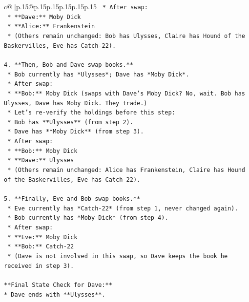 \documentclass{article}
\begin{document}
{\begin{supertabular}{c@{$\;$}|p{.15\linewidth}@{}p{.15\linewidth}p{.15\linewidth}p{.15\linewidth}p{.15\linewidth}p{.15\linewidth}}
{{{\texttt{    *   After swap:} \\
\texttt{        *   **Dave:** Moby Dick} \\
\texttt{        *   **Alice:** Frankenstein} \\
\texttt{    *   (Others remain unchanged: Bob has Ulysses, Claire has Hound of the Baskervilles, Eve has Catch{-}22).} \\
\\ 
\texttt{4.  **Then, Bob and Dave swap books.**} \\
\texttt{    *   Bob currently has *Ulysses*; Dave has *Moby Dick*.} \\
\texttt{    *   After swap:} \\
\texttt{        *   **Bob:** Moby Dick (swaps with Dave's Moby Dick? No, wait. Bob has Ulysses, Dave has Moby Dick. They trade.)} \\
\texttt{        *   Let's re{-}verify the holdings before this step:} \\
\texttt{            *   Bob has **Ulysses** (from step 2).} \\
\texttt{            *   Dave has **Moby Dick** (from step 3).} \\
\texttt{    *   After swap:} \\
\texttt{        *   **Bob:** Moby Dick} \\
\texttt{        *   **Dave:** Ulysses} \\
\texttt{    *   (Others remain unchanged: Alice has Frankenstein, Claire has Hound of the Baskervilles, Eve has Catch{-}22).} \\
\\ 
\texttt{5.  **Finally, Eve and Bob swap books.**} \\
\texttt{    *   Eve currently has *Catch{-}22* (from step 1, never changed again).} \\
\texttt{    *   Bob currently has *Moby Dick* (from step 4).} \\
\texttt{    *   After swap:} \\
\texttt{        *   **Eve:** Moby Dick} \\
\texttt{        *   **Bob:** Catch{-}22} \\
\texttt{    *   (Dave is not involved in this swap, so Dave keeps the book he received in step 3).} \\
\\ 
\texttt{**Final State Check for Dave:**} \\
\texttt{*   Dave ends with **Ulysses**.} \\
\\ 
}}}
\end{supertabular}}
\end{document}
